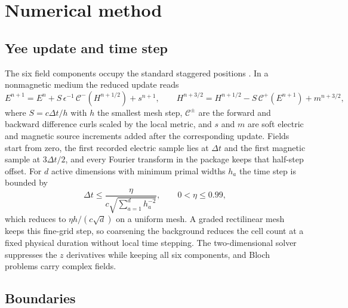 \documentclass[11pt,a4paper]{article}
\begin{document}
\section{Numerical method}
\label{sec:formulation}

\subsection{Yee update and time step}

The six field components occupy the standard staggered positions \citep{yee1966}. In a nonmagnetic medium the reduced update reads
\begin{equation}
E^{n+1}=E^{n}+S\,\epsilon^{-1}\,\mathcal{C}^{-}\!\left(H^{n+1/2}\right)+s^{n+1},\qquad
H^{n+3/2}=H^{n+1/2}-S\,\mathcal{C}^{+}\!\left(E^{n+1}\right)+m^{n+3/2},
\label{eq:yee}
\end{equation}
where $S=c\Delta t/h$ with $h$ the smallest mesh step, $\mathcal{C}^{\pm}$ are the forward and backward difference curls scaled by the local metric, and $s$ and $m$ are soft electric and magnetic source increments added after the corresponding update. Fields start from zero, the first recorded electric sample lies at $\Delta t$ and the first magnetic sample at $3\Delta t/2$, and every Fourier transform in the package keeps that half-step offset. For $d$ active dimensions with minimum primal widths $h_a$ the time step is bounded by
\begin{equation}
\Delta t\leq\frac{\eta}{c\sqrt{\sum_{a=1}^{d}h_a^{-2}}},\qquad 0<\eta\leq0.99,
\label{eq:cfl}
\end{equation}
which reduces to $\eta h/(c\sqrt{d})$ on a uniform mesh. A graded rectilinear mesh keeps this fine-grid step, so coarsening the background reduces the cell count at a fixed physical duration without local time stepping. The two-dimensional solver suppresses the $z$ derivatives while keeping all six components, and Bloch problems carry complex fields.

\subsection{Boundaries}
\end{document}
